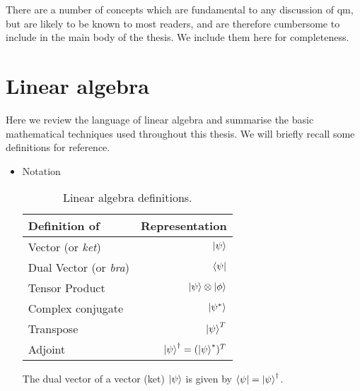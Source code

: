 There are a number of concepts which are fundamental to any discussion of \gls{qm}, 
    but are likely to be known to most readers, and are therefore cumbersome to include in the main body of the thesis. 
We include them here for completeness\footnotemark. 

\section{Linear algebra}\label{sec:linear_algebra}
Here we review the language of linear algebra and summarise the basic mathematical techniques used throughout this thesis.
We will briefly recall some definitions for reference. 

\begin{itemize}
\item Notation

    \begin{table}[H]
        \centering
        \begin{tabular}{lr}
            \hline 
            Definition of & Representation \\
            \hline 
            Vector (or \textit{ket})     & $\ket{\psi} $  \\
            Dual Vector (or \textit{bra}) & $\bra{\psi}  $ \\
            Tensor Product & $\ket{\psi} \otimes \ket{\phi}$ \\
            Complex conjugate & $\ket{\psi^{*}}$ \\
            Transpose & $\ket{\psi}^T $\\
            Adjoint & $\ket{\psi}^{\dag}  = (\ket{\psi}^{*})^{T}$\\
            \hline 
        \end{tabular}
        \caption[Linear algebra defintions]{Linear algebra definitions.}
        \label{table:linear_algebra}
    \end{table}
The dual vector of a vector (ket) $\ket{\psi} $ is given by $\bra{\psi} = \ket{\psi}^{\dag}$. 


\end{itemize}
